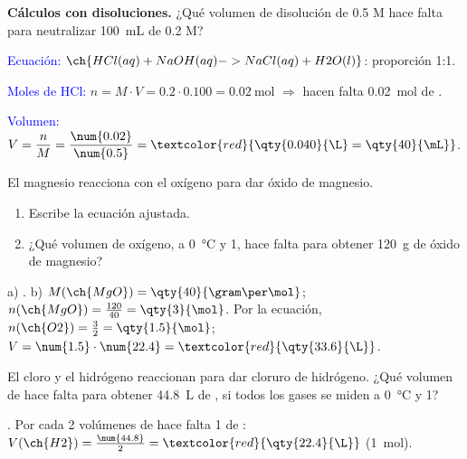 \begin{example}
    \textbf{Cálculos con disoluciones.} ¿Qué volumen de disolución de  \num{0.5} M hace falta para neutralizar \qty{100}{\mL} de  \num{0.2} M?

    \textcolor{blue}{Ecuación:} \(\ch{HCl (aq) + NaOH (aq) -> NaCl (aq) + H2O (l)}\): proporción 1:1.

    \textcolor{blue}{Moles de HCl:} \(n = M \cdot V = \num{0.2} \cdot \num{0.100} = \qty{0.02}{\mol}\) \(\Rightarrow\) hacen falta \qty{0.02}{\mol} de .

    \textcolor{blue}{Volumen:} \(V = \dfrac{n}{M} = \dfrac{\num{0.02}}{\num{0.5}} = \textcolor{red}{\qty{0.040}{\L} = \qty{40}{\mL}}\).
\end{example}

\begin{exercise}
    El magnesio reacciona con el oxígeno para dar óxido de magnesio.
    \begin{enumerate}[label=\alph*)]
        \item Escribe la ecuación ajustada.
        \item ¿Qué volumen de oxígeno, a \qty{0}{\celsius} y \qty{1}{\atm}, hace falta para obtener \qty{120}{\gram} de óxido de magnesio?
    \end{enumerate}
    \begin{solu}
        a) .
        b) \(M(\ch{MgO}) = \qty{40}{\gram\per\mol}\); \(n(\ch{MgO}) = \frac{120}{40} = \qty{3}{\mol}\). Por la ecuación, \(n(\ch{O2}) = \frac{3}{2} = \qty{1.5}{\mol}\); \(V = \num{1.5} \cdot \num{22.4} = \textcolor{red}{\qty{33.6}{\L}}\).
    \end{solu}
\end{exercise}

\begin{exercise}
    El cloro y el hidrógeno reaccionan para dar cloruro de hidrógeno. ¿Qué volumen de  hace falta para obtener \qty{44.8}{\L} de , si todos los gases se miden a \qty{0}{\celsius} y \qty{1}{\atm}?
    \begin{solu}
        . Por cada 2 volúmenes de  hace falta 1 de : \(V(\ch{H2}) = \frac{\num{44.8}}{2} = \textcolor{red}{\qty{22.4}{\L}}\) (\qty{1}{\mol}).
    \end{solu}
\end{exercise}

